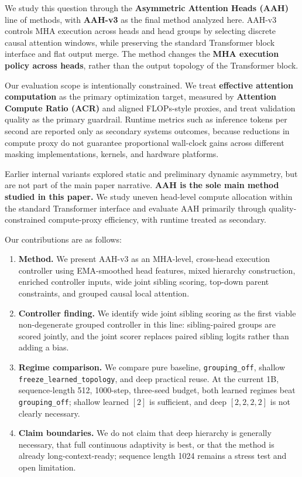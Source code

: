 \documentclass[11pt]{article}
\begin{document}
We study this question through the \textbf{Asymmetric Attention Heads (AAH)} line of methods, with \textbf{AAH-v3} as the final method analyzed here. AAH-v3 controls MHA execution across heads and head groups by selecting discrete causal attention windows, while preserving the standard Transformer block interface and flat output merge. The method changes the \textbf{MHA execution policy across heads}, rather than the output topology of the Transformer block.

Our evaluation scope is intentionally constrained. We treat \textbf{effective attention computation} as the primary optimization target, measured by \textbf{Attention Compute Ratio (ACR)} and aligned FLOPs-style proxies, and treat validation quality as the primary guardrail. Runtime metrics such as inference tokens per second are reported only as secondary systems outcomes, because reductions in compute proxy do not guarantee proportional wall-clock gains across different masking implementations, kernels, and hardware platforms.

Earlier internal variants explored static and preliminary dynamic asymmetry, but are not part of the main paper narrative. \textbf{AAH is the sole main method studied in this paper.} We study uneven head-level compute allocation within the standard Transformer interface and evaluate AAH primarily through quality-constrained compute-proxy efficiency, with runtime treated as secondary.

Our contributions are as follows:
\begin{enumerate}
  \item \textbf{Method.} We present AAH-v3 as an MHA-level, cross-head execution controller using EMA-smoothed head features, mixed hierarchy construction, enriched controller inputs, wide joint sibling scoring, top-down parent constraints, and grouped causal local attention.
  \item \textbf{Controller finding.} We identify wide joint sibling scoring as the first viable non-degenerate grouped controller in this line: sibling-paired groups are scored jointly, and the joint scorer replaces paired sibling logits rather than adding a bias.
  \item \textbf{Regime comparison.} We compare pure baseline, \texttt{grouping\_off}, shallow \texttt{freeze\_learned\_topology}, and deep practical reuse. At the current 1B, sequence-length 512, 1000-step, three-seed budget, both learned regimes beat \texttt{grouping\_off}; shallow learned \([2]\) is sufficient, and deep \([2,2,2,2]\) is not clearly necessary.
  \item \textbf{Claim boundaries.} We do not claim that deep hierarchy is generally necessary, that full continuous adaptivity is best, or that the method is already long-context-ready; sequence length 1024 remains a stress test and open limitation.
\end{enumerate}
\end{document}
